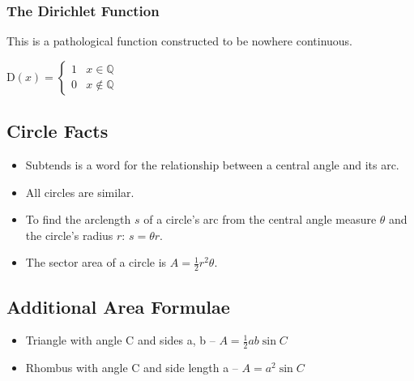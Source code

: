 \documentclass{article}
\begin{document}
\subsubsection{The Dirichlet Function}
This is a pathological function constructed to be nowhere continuous.

D$(x) = \begin{cases}
    1 & x\in\mathbb{Q}\\
    0 & x\notin\mathbb{Q}
\end{cases}$

\subsection{Circle Facts}
\begin{itemize}
    \item Subtends is a word for the relationship between a central angle and its arc.
    \item All circles are similar.
    \item To find the arclength $s$ of a circle's arc from the central angle measure $\theta$ and the circle's radius $r$: $s=\theta r$.
    \item The sector area of a circle is $A=\frac{1}{2}r^2\theta$.
\end{itemize}

\subsection{Additional Area Formulae}
\begin{itemize}
    \item Triangle with angle C and sides a, b -- $A=\frac{1}{2}ab\sin{C}$
    \item Rhombus with angle C and side length a -- $A=a^2\sin{C}$
\end{itemize}
\end{document}
